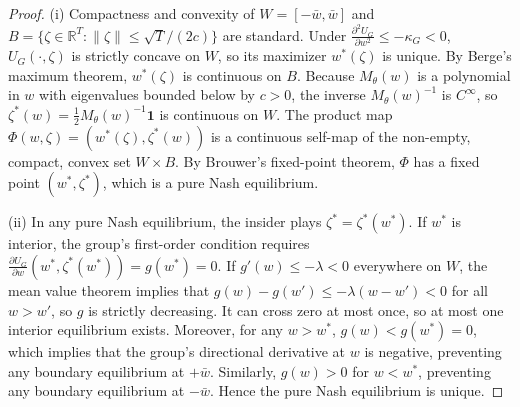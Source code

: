 \documentclass[12pt]{article}
\theoremstyle{definition}
\theoremstyle{remark}
\begin{document}
\begin{proof}
(i) Compactness and convexity of $W=[-\bar w,\bar w]$ and $B=\{\zeta\in\mathbb R^T:\|\zeta\|\le\sqrt T/(2c)\}$ are standard. Under $\frac{\partial^2 U_G}{\partial w^2}\le-\kappa_G<0$, $U_G(\cdot,\zeta)$ is strictly concave on $W$, so its maximizer $w^*(\zeta)$ is unique. By Berge's maximum theorem, $w^*(\zeta)$ is continuous on $B$. Because $M_\theta(w)$ is a polynomial in $w$ with eigenvalues bounded below by $c>0$, the inverse $M_\theta(w)^{-1}$ is $C^\infty$, so $\zeta^*(w)=\frac12 M_\theta(w)^{-1}\mathbf 1$ is continuous on $W$. The product map $\Phi(w,\zeta)=(w^*(\zeta),\zeta^*(w))$ is a continuous self-map of the non-empty, compact, convex set $W\times B$. By Brouwer's fixed-point theorem, $\Phi$ has a fixed point $(w^*,\zeta^*)$, which is a pure Nash equilibrium.

(ii) In any pure Nash equilibrium, the insider plays $\zeta^*=\zeta^*(w^*)$. If $w^*$ is interior, the group's first-order condition requires $\frac{\partial U_G}{\partial w}(w^*,\zeta^*(w^*))=g(w^*)=0$. If $g'(w)\le-\lambda<0$ everywhere on $W$, the mean value theorem implies that $g(w)-g(w')\le-\lambda(w-w')<0$ for all $w>w'$, so $g$ is strictly decreasing. It can cross zero at most once, so at most one interior equilibrium exists. Moreover, for any $w>w^*$, $g(w)<g(w^*)=0$, which implies that the group's directional derivative at $w$ is negative, preventing any boundary equilibrium at $+\bar w$. Similarly, $g(w)>0$ for $w<w^*$, preventing any boundary equilibrium at $-\bar w$. Hence the pure Nash equilibrium is unique.
\end{proof}
\end{document}
